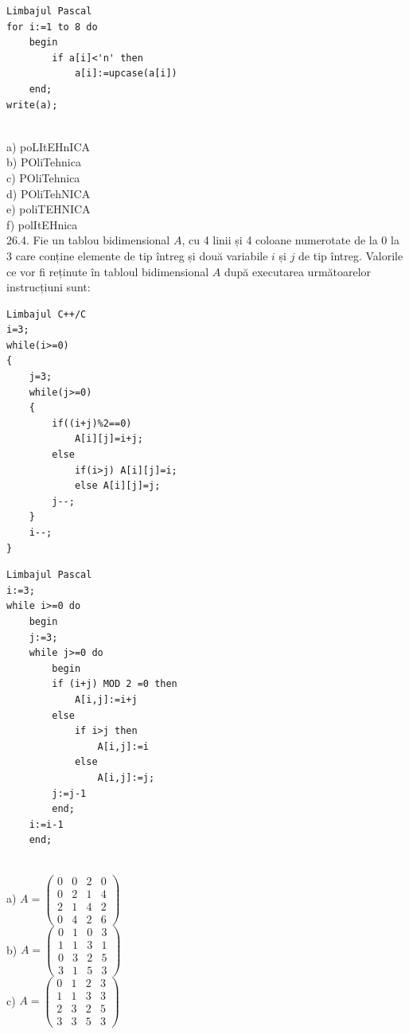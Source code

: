 {{\begin{verbatim}
Limbajul Pascal
for i:=1 to 8 do
    begin
        if a[i]<'n' then
            a[i]:=upcase(a[i])
    end;
write(a);
\end{verbatim}
\\
a) poLItEHnICA
\\
b) POliTehnica
\\
c) POliTehnica
\\
d) POliTehNICA
\\
e) poliTEHNICA
\\
f) polItEHnica
\\
26.4. Fie un tablou bidimensional $A$, cu 4 linii și 4 coloane numerotate de la 0 la 3 care conține elemente de tip întreg și două variabile $i$ și $j$ de tip întreg. Valorile ce vor fi reținute în tabloul bidimensional $A$ după executarea următoarelor instrucțiuni sunt:
\begin{verbatim}
Limbajul C++/C
i=3;
while(i>=0)
{
    j=3;
    while(j>=0)
    {
        if((i+j)%2==0)
            A[i][j]=i+j;
        else
            if(i>j) A[i][j]=i;
            else A[i][j]=j;
        j--;
    }
    i--;
}
\end{verbatim}
\begin{verbatim}
Limbajul Pascal
i:=3;
while i>=0 do
    begin
    j:=3;
    while j>=0 do
        begin
        if (i+j) MOD 2 =0 then
            A[i,j]:=i+j
        else
            if i>j then
                A[i,j]:=i
            else
                A[i,j]:=j;
        j:=j-1
        end;
    i:=i-1
    end;
\end{verbatim}
\\
a) $A=\left(\begin{array}{llll}0 & 0 & 2 & 0 \\ 0 & 2 & 1 & 4 \\ 2 & 1 & 4 & 2 \\ 0 & 4 & 2 & 6\end{array}\right)$
\\
b) $A=\left(\begin{array}{llll}0 & 1 & 0 & 3 \\ 1 & 1 & 3 & 1 \\ 0 & 3 & 2 & 5 \\ 3 & 1 & 5 & 3\end{array}\right)$
\\
c) $A=\left(\begin{array}{llll}0 & 1 & 2 & 3 \\ 1 & 1 & 3 & 3 \\ 2 & 3 & 2 & 5 \\ 3 & 3 & 5 & 3\end{array}\right)$
}}
